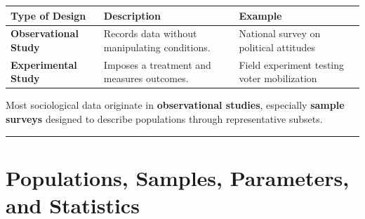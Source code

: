 \documentclass[
  letterpaper,
  DIV=11,
  numbers=noendperiod]{scrreprt}
\begin{document}
\begin{longtable}[]{@{}
  >{\raggedright\arraybackslash}p{}
  >{\raggedright\arraybackslash}p{}
  >{\raggedright\arraybackslash}p{}@{}}
\toprule\noalign{}
\begin{minipage}[b]{\linewidth}\raggedright
\textbf{Type of Design}
\end{minipage} & \begin{minipage}[b]{\linewidth}\raggedright
\textbf{Description}
\end{minipage} & \begin{minipage}[b]{\linewidth}\raggedright
\textbf{Example}
\end{minipage} \\
\midrule\noalign{}
\endhead
\bottomrule\noalign{}
\endlastfoot
\textbf{Observational Study} & Records data without manipulating
conditions. & National survey on political attitudes \\
\textbf{Experimental Study} & Imposes a treatment and measures outcomes.
& Field experiment testing voter mobilization \\
\end{longtable}

Most sociological data originate in \textbf{observational studies},
especially \textbf{sample surveys} designed to describe populations
through representative subsets.

\begin{center}\rule{0.5\linewidth}{0.5pt}\end{center}

\section{Populations, Samples, Parameters, and
Statistics}\label{populations-samples-parameters-and-statistics}
\end{document}
